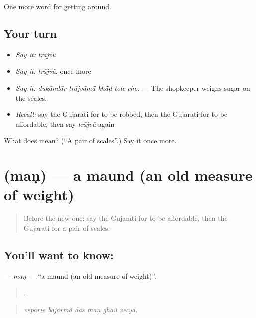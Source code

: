 \begin{grammarlens}[title={What you've built}]
One more word for getting around.
\end{grammarlens}

\subsection*{Your turn}
\begin{itemize}
\raggedright
  \item \emph{Say it:} \emph{trājvũ}
  \item \emph{Say it:} \emph{trājvũ}, once more
  \item \emph{Say it:} \emph{dukāndār trājvāmā̃ khā̃ḍ tole che.} — The shopkeeper weighs sugar on the scales.
  \item \emph{Recall:} say the Gujarati for to be robbed, then the Gujarati for to be affordable, then say \emph{trājvũ} again
\end{itemize}

\begin{tcolorbox}[breakable,colback=teal!4,colframe=teal!35!black,title={Before you move on}]
What does  mean? (\textquotedblleft{}A pair of scales\textquotedblright{}.) Say it once more.
\end{tcolorbox}
\section[\texorpdfstring{\gu{મણ} (maṇ)}{મણ (maṇ)}]{ (maṇ) — a maund (an old measure of weight)}

\label{lesson:GU-C430-man}



\begin{quote}
Before the new one: say the Gujarati for to be affordable, then the Gujarati for a pair of scales.
\end{quote}

\subsection*{You'll want to know: }
\textbf{} — \emph{maṇ} — \textquotedblleft{}a maund (an old measure of weight)\textquotedblright{}.

\begin{quote}
     .
\end{quote}

\begin{quote}
\emph{vepārīe bajārmā̃ das maṇ ghaũ vecyā.}
\end{quote}

